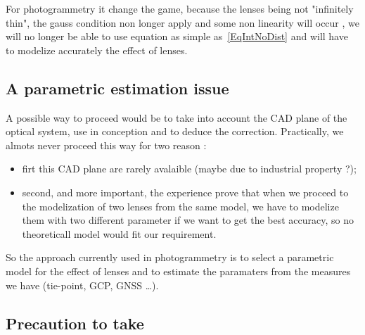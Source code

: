 For photogrammetry it change the game, because the lenses being not "infinitely thin", the gauss
condition non longer apply and some non linearity will occur , we will no longer be able to use
equation as simple as~\ref{EqIntNoDist} and will have to modelize accurately the effect of
lenses. 


\subsection{A parametric estimation issue}

A possible way to proceed would be to take into account the CAD plane of the optical
system, use in conception and to deduce the correction.  Practically, we almots never proceed
this way for two reason  :

\begin{itemize}
   \item firt this CAD plane are rarely avalaible (maybe due to industrial property ?);
   \item second, and more important, the experience prove that when we proceed to the
         modelization of two lenses from the same model, we have to modelize them with two
         different parameter if we want to get the best accuracy, so no theoreticall model 
         would fit our requirement.
\end{itemize}

So the approach currently used in photogrammetry is to select a parametric model
for the effect of lenses and to estimate the paramaters from the measures we have  (tie-point,
GCP, GNSS  \dots).


\subsection{Precaution to take}

